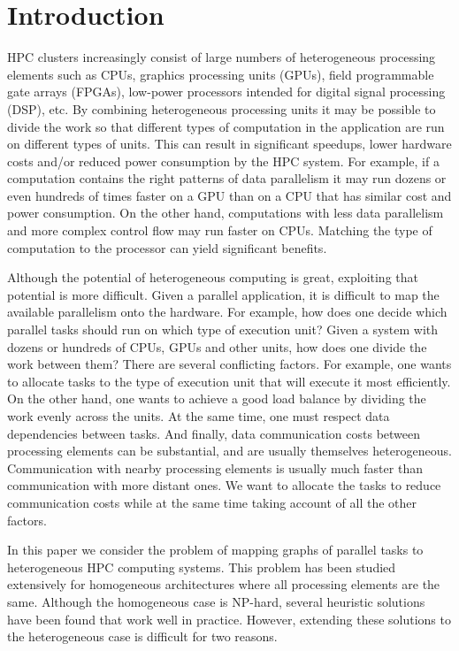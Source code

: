 \section{Introduction}
\label{sec:introduction}

HPC clusters increasingly consist of large numbers of heterogeneous
processing elements such as CPUs, graphics processing units (GPUs),
field programmable gate arrays (FPGAs), low-power processors intended
for digital signal processing (DSP), etc. By combining heterogeneous
processing units it may be possible to divide the work so that different
types of computation in the application are run on different types of
units. This can result in significant speedups, lower hardware costs
and/or reduced power consumption by the HPC system.  For example, if a
computation contains the right patterns of data parallelism it may run
dozens or even hundreds of times faster on a GPU than on a CPU that has
similar cost and power consumption. On the other hand, computations with
less data parallelism and more complex control flow may run faster on
CPUs. Matching the type of computation to the processor can yield
significant benefits.

Although the potential of heterogeneous computing is great, exploiting
that potential is more difficult. Given a parallel application, it is
difficult to map the available parallelism onto the hardware. For
example, how does one decide which parallel tasks should run on which
type of execution unit? Given a system with dozens or hundreds of CPUs,
GPUs and other units, how does one divide the work between them?  There
are several conflicting factors. For example, one wants to allocate
tasks to the type of execution unit that will execute it most
efficiently. On the other hand, one wants to achieve a good load balance
by dividing the work evenly across the units. At the same time, one must
respect data dependencies between tasks. And finally, data communication
costs between processing elements can be substantial, and are usually
themselves heterogeneous. Communication with nearby processing elements
is usually much faster than communication with more distant ones. We
want to allocate the tasks to reduce communication costs while at the
same time taking account of all the other factors.

In this paper we consider the problem of mapping graphs of parallel
tasks to heterogeneous HPC computing systems. This problem has been
studied extensively for homogeneous architectures where all processing
elements are the same. Although the homogeneous case is NP-hard, several
heuristic solutions have been found that work well in practice. However,
extending these solutions to the heterogeneous case is difficult for two
reasons.

